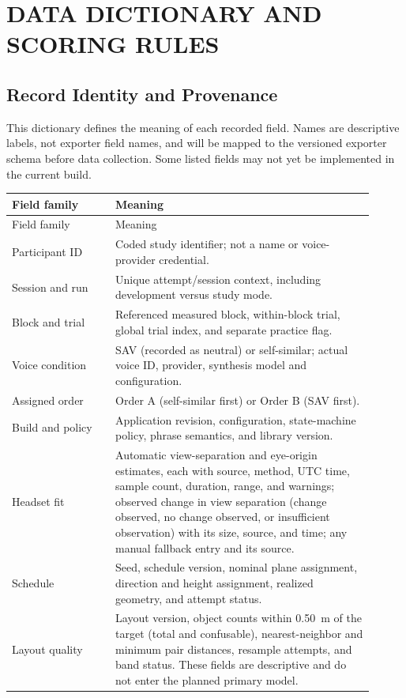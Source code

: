 \chapter{DATA DICTIONARY AND SCORING RULES}
\label{app:data}
\newpage
\section{Record Identity and Provenance}
This dictionary defines the meaning of each recorded field. Names are descriptive labels, not exporter field names, and will be mapped to the versioned exporter schema before data collection. Some listed fields may not yet be implemented in the current build.

\begingroup
{}
\begin{longtable}{@{}p{0.26\linewidth}p{0.65\linewidth}@{}}
\toprule
Field family & Meaning \\\midrule\endfirsthead
\toprule Field family & Meaning \\\midrule\endhead
Participant ID & Coded study identifier; not a name or voice-provider credential.\\
Session and run & Unique attempt/session context, including development versus study mode.\\
Block and trial & Referenced measured block, within-block trial, global trial index, and separate practice flag.\\
Voice condition & SAV (recorded as neutral) or self-similar; actual voice ID, provider, synthesis model and configuration.\\
Assigned order & Order A (self-similar first) or Order B (SAV first).\\
Build and policy & Application revision, configuration, state-machine policy, phrase semantics, and library version.\\
Headset fit & Automatic view-separation and eye-origin estimates, each with source, method, UTC time, sample count, duration, range, and warnings; observed change in view separation (change observed, no change observed, or insufficient observation) with its size, source, and time; any manual fallback entry and its source.\\
Schedule & Seed, schedule version, nominal plane assignment, direction and height assignment, realized geometry, and attempt status.\\
Layout quality & Layout version, object counts within 0.50~m of the target (total and confusable), nearest-neighbor and minimum pair distances, resample attempts, and band status. These fields are descriptive and do not enter the planned primary model.\\

\end{longtable}
